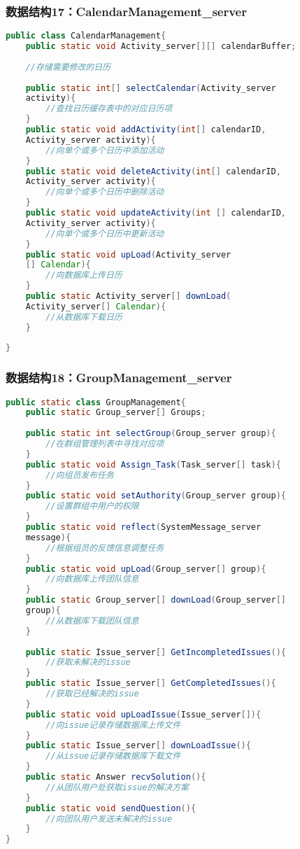 \subsubsection{数据结构17：CalendarManagement\_server}
\begin{lstlisting}[language=Java, caption=日历管理类]
public class CalendarManagement{
    public static void Activity_server[][] calendarBuffer;
    
    //存储需要修改的日历
    
    public static int[] selectCalendar(Activity_server
    activity){
        //查找日历缓存表中的对应日历项
    }
    public static void addActivity(int[] calendarID, 
    Activity_server activity){
        //向单个或多个日历中添加活动
    }
    public static void deleteActivity(int[] calendarID, 
    Activity_server activity){
        //向单个或多个日历中删除活动
    }
    public static void updateActivity(int [] calendarID, 
    Activity_server activity){
        //向单个或多个日历中更新活动
    }
    public static void upLoad(Activity_server
    [] Calendar){
        //向数据库上传日历
    }
    public static Activity_server[] downLoad(
    Activity_server[] Calendar){
        //从数据库下载日历
    }
    
}
\end{lstlisting}
{\color{red}
\subsubsection{\color{red} 数据结构18：GroupManagement\_server}
\begin{lstlisting}[language=Java, caption=团队管理类]
public static class GroupManagement{
    public static Group_server[] Groups;
    
    public static int selectGroup(Group_server group){
        //在群组管理列表中寻找对应项
    }
    public static void Assign_Task(Task_server[] task){
        //向组员发布任务
    }
    public static void setAuthority(Group_server group){
        //设置群组中用户的权限
    }
    public static void reflect(SystemMessage_server 
    message){
        //根据组员的反馈信息调整任务
    }
    public static void upLoad(Group_server[] group){
        //向数据库上传团队信息
    }
    public static Group_server[] downLoad(Group_server[] 
    group){
        //从数据库下载团队信息
    }
    
    public static Issue_server[] GetIncompletedIssues(){
        //获取未解决的issue
    }
    public static Issue_server[] GetCompletedIssues(){
        //获取已经解决的issue
    }
    public static void upLoadIssue(Issue_server[]){
        //向issue记录存储数据库上传文件
    }
    public static Issue_server[] downLoadIssue(){
        //从issue记录存储数据库下载文件
    }
    public static Answer recvSolution(){
        //从团队用户处获取issue的解决方案
    }
    public static void sendQuestion(){
        //向团队用户发送未解决的issue
    }
}
\end{lstlisting}
}

